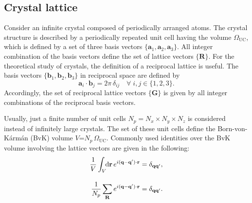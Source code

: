 \subsection{Crystal lattice}

Consider an infinite crystal composed of periodically arranged atoms. The crystal structure is described by a periodically repeated unit cell having the volume $\Omega^{\phantom{I}}_\text{UC}$, which is defined by a set of three basis vectors $\{\mathbf{a}_1,\mathbf{a}_2,\mathbf{a}_3\}$. All integer combination of the basis vectors  define the set of lattice vectors $\{\mathbf{R}\}$. For the theoretical study of crystals, the definition of a reciprocal lattice is useful. The basis vectors $\{\mathbf{b}_1,\mathbf{b}_2,\mathbf{b}_3\}$ in reciprocal space are defined by
%
\begin{equation}
    \mathbf{a}_i\cdot\mathbf{b}_j = 2\pi\,\delta_{ij} \quad   \forall \; i,j \in \{1,2,3\}.
\end{equation}
%
Accordingly, the set of reciprocal lattice vectors  $\{\mathbf{G}\}$ is given by all integer combinations of the reciprocal basis vectors.\par
Usually, just a finite number of unit cells $N_p=N_x\!\times\!N_y\!\times\!N_z$ is considered instead of infinitely large crystals. The set of these unit cells define the Born-von-K\'{a}rm\'{a}n (BvK) volume $V$=$N_p\,\Omega^{\phantom{I}}_\text{UC}$.\newpage
\noindent Commonly used identities over the BvK volume involving the lattice vectors are  given in the following:
%
\begin{align}
    \frac{1}{V}\int_V \text{\!\!d}\mathbf{r}\,e^{i\mathbf{(q-q')\cdot r}} & = \delta_\mathbf{qq'},\\[10pt]
    \frac{1}{N_p}\sum_\mathbf{R}e^{i\mathbf{(q-q')\cdot r}}  & = \delta_\mathbf{qq'}\label{crystalsum}.
\end{align}

